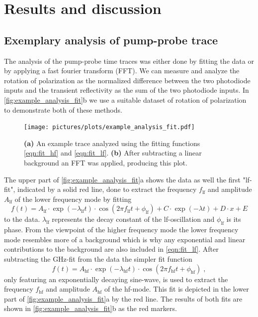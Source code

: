 \chapter{Results and discussion}
\section{Exemplary analysis of pump-probe trace}
The analysis of the pump-probe time traces was either done by fitting the data or by applying a fast fourier transform (FFT).
We can measure and analyze the rotation of polarization as the normalized difference between the two photodiode inputs and the transient reflectivity as the sum of the two photodiode inputs.
In \autoref{fig:example_analysis_fit}b we use a suitable dataset of rotation of polarization to demonstrate both of these methods.
\begin{figure}[ht]
    \centering
    \texttt{[image: pictures/plots/example\_analysis\_fit.pdf]}
    \caption{\textbf{(a)} An example trace analyzed using the fitting functions \autoref{eqn:fit_hf} and \autoref{eqn:fit_lf}. \textbf{(b)} After subtracting a linear background an FFT was applied, producing this plot.}
    \label{fig:example_analysis_fit}
\end{figure}
\FloatBarrier
The upper part of \autoref{fig:example_analysis_fit}a shows the data as well the first "lf-fit", indicated by a solid red line, done to extract the frequency $f_{\text{lf}}$ and amplitude $A_{\text{lf}}$ of the lower frequency mode by fitting
\begin{equation}
    f(t) = A_{\text{lf}} \cdot \exp(-\lambda_{\text{lf}} t) \cdot \cos(2 \pi f_{\text{lf}} t + \phi_{\text{lf}}) + C \cdot \exp(-\lambda t) + D \cdot x + E
    \label{eqn:fit_lf}
\end{equation}
to the data.
$\lambda_{\text{lf}}$ represents the decay constant of the lf-oscillation and $\phi_{\text{lf}}$ is its phase.
From the viewpoint of the higher frequency mode the lower frequency mode resembles more of a background which is why any exponential and linear contributions to the background are also included in \autoref{eqn:fit_lf}.
After subtracting the GHz-fit from the data the simpler fit function
\begin{equation}
    f(t) = A_{\text{hf}} \cdot \exp(-\lambda_{\text{hf}} t) \cdot \cos(2 \pi f_{\text{hf}} t + \phi_{\text{hf}}) \;,
    \label{eqn:fit_hf}
\end{equation}
only featuring an exponentially decaying sine-wave, is used to extract the frequency $f_{\text{hf}}$ and amplitude $A_{\text{hf}}$ of the hf-mode.
This fit is depicted in the lower part of \autoref{fig:example_analysis_fit}a by the red line.
The results of both fits are shown in \autoref{fig:example_analysis_fit}b as the red markers.

